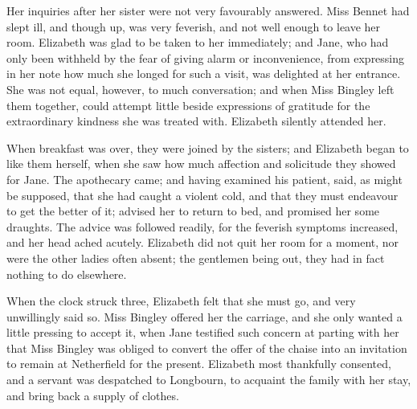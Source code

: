 


Her inquiries after her sister were not very favourably answered. Miss Bennet had slept ill, and though up, was very feverish, and not well enough to leave her room. Elizabeth was glad to be taken to her immediately; and Jane, who had only been withheld by the fear of giving alarm or inconvenience, from expressing in her note how much she longed for such a visit, was delighted at her entrance. She was not equal, however, to much conversation; and when Miss Bingley left them together, could attempt little beside expressions of gratitude for the extraordinary kindness she was treated with. Elizabeth silently attended her.



When breakfast was over, they were joined by the sisters; and Elizabeth began to like them herself, when she saw how much affection and solicitude they showed for Jane. The apothecary came; and having examined his patient, said, as might be supposed, that she had caught a violent cold, and that they must endeavour to get the better of it; advised her to return to bed, and promised her some draughts. The advice was followed readily, for the feverish symptoms increased, and her head ached acutely. Elizabeth did not quit her room for a moment, nor were the other ladies often absent; the gentlemen being out, they had in fact nothing to do elsewhere.

When the clock struck three, Elizabeth felt that she must go, and very unwillingly said so. Miss Bingley offered her the carriage, and she only wanted a little pressing to accept it, when Jane testified such concern at parting with her that Miss Bingley was obliged to convert the offer of the chaise into an invitation to remain at Netherfield for the present. Elizabeth most thankfully consented, and a servant was despatched to Longbourn, to acquaint the family with her stay, and bring back a supply of clothes.